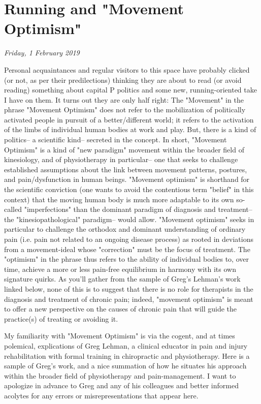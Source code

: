 \chapter{Running and "Movement Optimism"}
\textit{Friday, 1 February 2019}
\bigskip

Personal acquaintances and regular visitors to this space have probably clicked (or not, as per their predilections) thinking they are about to read (or avoid reading) something about capital P politics and some new, running-oriented take I have on them. It turns out they are only half right: The "Movement" in the phrase "Movement Optimism" does not refer to the mobilization of politically activated people in pursuit of a better/different world; it refers to the activation of the limbs of individual human bodies at work and play. But, there is a kind of politics-- a scientific kind-- secreted in the concept. In short, "Movement Optimism" is a kind of "new paradigm" movement within the broader field of kinesiology, and of physiotherapy in particular-- one that seeks to challenge established assumptions about the link between movement patterns, postures, and pain/dysfunction in human beings. "Movement optimism" is shorthand for the scientific conviction (one wants to avoid the contentious term "belief" in this context) that the moving human body is much more adaptable to its own so-called "imperfections" than the dominant paradigm of diagnosis and treatment-- the "kinesiopathological" paradigm-- would allow. "Movement optimism" seeks in particular to challenge the orthodox and dominant understanding of ordinary pain (i.e. pain not related to an ongoing disease process) as rooted in deviations from a movement-ideal whose "correction" must be the focus of treatment. The "optimism" in the phrase thus refers to the ability of individual bodies to, over time, achieve a more or less pain-free equilibrium in harmony with its own signature quirks. As you'll gather from the sample of Greg's Lehman's work linked below, none of this is to suggest that there is no role for therapists in the diagnosis and treatment of chronic pain; indeed, "movement optimism" is meant to offer a new perspective on the causes of chronic pain that will guide the practice(s) of treating or avoiding it.

My familiarity with "Movement Optimism" is via the cogent, and at times polemical, explications of Greg Lehman, a clinical educator in pain and injury rehabilitation with formal training in chiropractic and physiotherapy. Here is a sample of Greg's work, and a nice summation of how he situates his approach within the broader field of physiotherapy and pain-management. I want to apologize in advance to Greg and any of his colleagues and better informed acolytes for any errors or misrepresentations that appear here.

